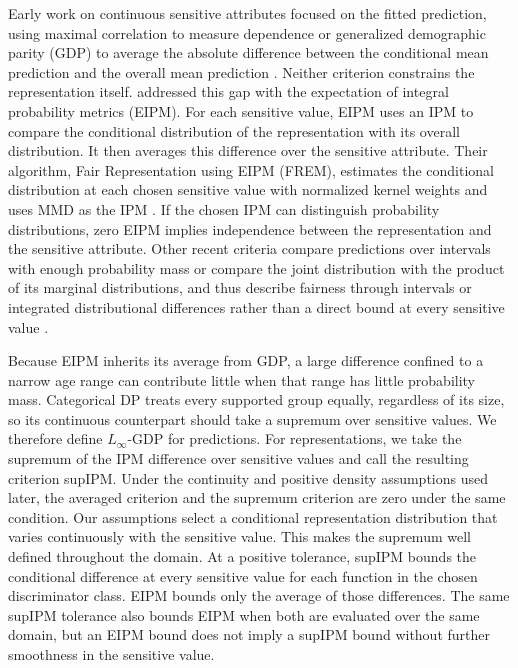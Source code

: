 \documentclass{article} %
\begin{document}
Early work on continuous sensitive attributes focused on the fitted prediction, using maximal correlation to measure dependence or generalized demographic parity (GDP) to average the absolute difference between the conditional mean prediction and the overall mean prediction \citep{mary2019continuous,grari2020continuous,jiang2022gdp}.  Neither criterion constrains the representation itself.  \citet{kong2025fair} addressed this gap with the expectation of integral probability metrics (EIPM).  For each sensitive value, EIPM uses an IPM to compare the conditional distribution of the representation with its overall distribution.  It then averages this difference over the sensitive attribute.  Their algorithm, Fair Representation using EIPM (FREM), estimates the conditional distribution at each chosen sensitive value with normalized kernel weights and uses MMD as the IPM \citep{gretton2012kernel}.  If the chosen IPM can distinguish probability distributions, zero EIPM implies independence between the representation and the sensitive attribute.  Other recent criteria compare predictions over intervals with enough probability mass or compare the joint distribution with the product of its marginal distributions, and thus describe fairness through intervals or integrated distributional differences rather than a direct bound at every sensitive value \citep{kim2024probable,ni2026joint}.

Because EIPM inherits its average from GDP, a large difference confined to a narrow age range can contribute little when that range has little probability mass.  Categorical DP treats every supported group equally, regardless of its size, so its continuous counterpart should take a supremum over sensitive values.  We therefore define $L_{\infty}$-GDP for predictions.  For representations, we take the supremum of the IPM difference over sensitive values and call the resulting criterion supIPM.  Under the continuity and positive density assumptions used later, the averaged criterion and the supremum criterion are zero under the same condition.  Our assumptions select a conditional representation distribution that varies continuously with the sensitive value.  This makes the supremum well defined throughout the domain.  At a positive tolerance, supIPM bounds the conditional difference at every sensitive value for each function in the chosen discriminator class.  EIPM bounds only the average of those differences.  The same supIPM tolerance also bounds EIPM when both are evaluated over the same domain, but an EIPM bound does not imply a supIPM bound without further smoothness in the sensitive value.
\end{document}

